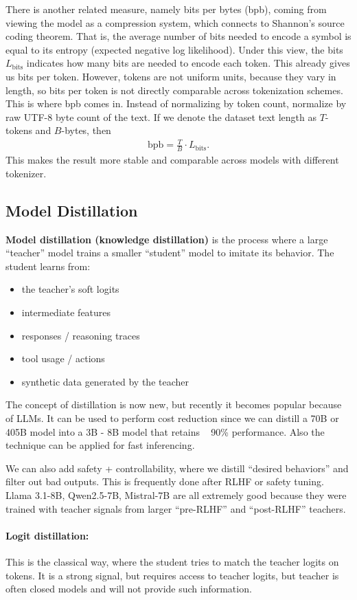 \documentclass[11pt]{article}  %
\begin{document}
There is another related measure, namely bits per bytes (bpb), coming from viewing the model as a compression system, which connects to Shannon's source coding theorem.
That is, the average number of bits needed to encode a symbol is equal to its entropy (expected negative log likelihood).
Under this view, the bits $L_{\text{bits}}$ indicates how many bits are needed to encode each token.
This already gives us bits per token.
However, tokens are not uniform units, because they vary in length, so bits per token is not directly comparable across tokenization schemes.
This is where bpb comes in.
Instead of normalizing by token count, normalize by raw UTF-8 byte count of the text.
If we denote the dataset text length as $T$-tokens and $B$-bytes, then 
\begin{align*}
  \text{bpb} = \frac{T}{B}\cdot L_{\text{bits}}.
\end{align*}
This makes the result more stable and comparable across models with different tokenizer.


\subsection{Model Distillation}
\textbf{Model distillation (knowledge distillation)} is the process where a large ``teacher'' model trains a smaller ``student'' model to imitate its behavior.
The student learns from:
\begin{itemize}
  \item the teacher's soft logits
  \item intermediate features
  \item responses / reasoning traces
  \item tool usage / actions
  \item synthetic data generated by the teacher
\end{itemize}
The concept of distillation is now new, but recently it becomes popular because of LLMs.
It can be used to perform cost reduction since we can distill a 70B or 405B model into a 3B - 8B model that retains ~ 90\% performance.
Also the technique can be applied for fast inferencing.

We can also add safety + controllability, where we distill ``desired behaviors'' and filter out bad outputs.
This is frequently done after RLHF or safety tuning.
Llama 3.1-8B, Qwen2.5-7B, Mistral-7B are all extremely good because they were trained with teacher signals from larger ``pre-RLHF'' and ``post-RLHF'' teachers.


\paragraph{Logit distillation:} 
This is the classical way, where the student tries to match the teacher logits on tokens.
It is a strong signal, but requires access to teacher logits, but teacher is often closed models and will not provide such information.
\end{document}
